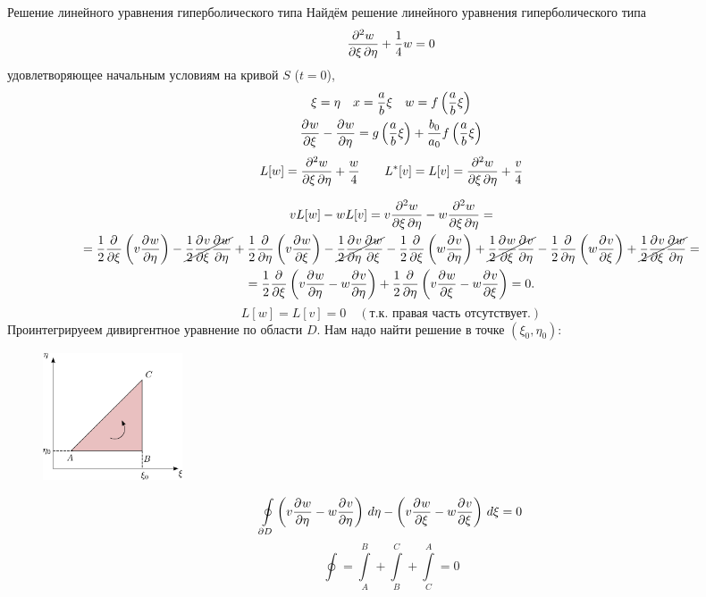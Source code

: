 \begin{example}{Решение линейного уравнения гиперболического типа}
Найдём решение линейного уравнения гиперболического типа
\[
	\frac{\partial^2w}{\partial \xi\, \partial \eta} + \frac{1}{4}w = 0
\]
удовлетворяющее начальным условиям на кривой $S$ ($t = 0$),
\begin{gather*}
	\xi = \eta \quad x = \frac{a}{b} \xi \quad w = f\left(\frac{a}{b} \xi\right)\\
	\frac{\partial^{}w}{\partial \xi^{}} - \frac{\partial^{}w}{\partial \eta^{}} = g\left(\frac{a}{b}\xi\right) + \frac{b_0}{a_0} f\left(\frac{a}{b} \xi\right)
\end{gather*}
\[	
	L[w] = \frac{\partial^2w}{\partial \xi\, \partial \eta} + \frac{w}{4} \qquad L^*[v] = L[v] = \frac{\partial^2w}{\partial \xi\, \partial \eta} + \frac{v}{4}
\]

\begin{multline*}
	v L[w] - w L[v] = v \frac{\partial^2w}{\partial \xi\, \partial \eta} - w \frac{\partial^2w}{\partial \xi\, \partial \eta} = \\ = \frac{1}{2} \frac{\partial^{}}{\partial \xi^{}} \left(v \frac{\partial^{}w}{\partial \eta^{}} \right) - \cancel{\frac{1}{2} \frac{\partial^{}v}{\partial \xi^{}} \frac{\partial^{}w}{\partial \eta^{}}} + \frac{1}{2} \frac{\partial^{}}{\partial \eta^{}} \left(v \frac{\partial^{}w}{\partial \xi^{}} \right) - \cancel{\frac{1}{2} \frac{\partial^{}v}{\partial \eta^{}} \frac{\partial^{}w}{\partial \xi^{}}}	- \frac{1}{2} \frac{\partial^{}}{\partial \xi^{}} \left(w \frac{\partial^{}v}{\partial \eta^{}} \right) + \cancel{\frac{1}{2} \frac{\partial^{}w}{\partial \xi^{}} \frac{\partial^{}v}{\partial \eta^{}}} - \frac{1}{2} \frac{\partial^{}}{\partial \eta^{}} \left(w \frac{\partial^{}v}{\partial \xi^{}} \right) + \cancel{\frac{1}{2} \frac{\partial^{}v}{\partial \xi^{}} \frac{\partial^{}w}{\partial \eta^{}}} = \\
	= \frac{1}{2} \frac{\partial^{}}{\partial \xi^{}}\left(v \frac{\partial^{}w}{\partial \eta^{}} - w \frac{\partial^{}v}{\partial \eta^{}} \right) + \frac{1}{2} \frac{\partial^{}}{\partial \eta^{}} \left(v \frac{\partial^{}w}{\partial \xi^{}} - w \frac{\partial^{}v}{\partial \xi^{}}\right) = 0.
\end{multline*}
\[
	L[w] = L[v] = 0 \quad(\mbox{т.к. правая часть отсутствует.})	
\]
Проинтегрируеем дивиргентное уравнение по области $D$. Нам надо найти решение в точке $(\xi_0, \eta_0)$:
\begin{figure}
	\centering
	\includegraphics[width=0.2\textwidth]{figHyperRiman2.pdf}
\end{figure}
\begin{minipage}[t]{0.7\textwidth}
\[
	\oint\limits_{\partial D} \left(v \frac{\partial^{}w}{\partial \eta^{}} - w \frac{\partial^{}v}{\partial \eta^{}} \right) \, d\eta - \left(v \frac{\partial^{}w}{\partial \xi^{}} - w \frac{\partial^{}v}{\partial \xi^{}}\right)\, d\xi = 0\\
\]
\[
	\oint = \int\limits_A^B + \int\limits_B^C + \int\limits_C^A = 0
\]
\end{minipage}\\


\end{example}
